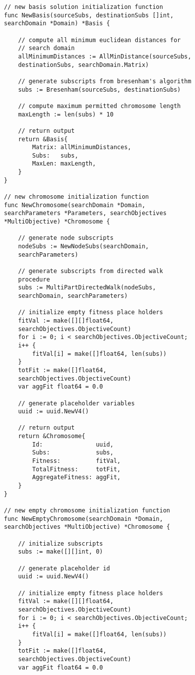 \begin{lstlisting}[basicstyle=\small]
// new basis solution initialization function
func NewBasis(sourceSubs, destinationSubs []int, 
searchDomain *Domain) *Basis {

	// compute all minimum euclidean distances for 
	// search domain
	allMinimumDistances := AllMinDistance(sourceSubs, 
	destinationSubs, searchDomain.Matrix)

	// generate subscripts from bresenham's algorithm
	subs := Bresenham(sourceSubs, destinationSubs)

	// compute maximum permitted chromosome length
	maxLength := len(subs) * 10

	// return output
	return &Basis{
		Matrix: allMinimumDistances,
		Subs:   subs,
		MaxLen: maxLength,
	}
}

// new chromosome initialization function
func NewChromosome(searchDomain *Domain, 
searchParameters *Parameters, searchObjectives 
*MultiObjective) *Chromosome {

	// generate node subscripts
	nodeSubs := NewNodeSubs(searchDomain, 
	searchParameters)

	// generate subscripts from directed walk 
	procedure
	subs := MultiPartDirectedWalk(nodeSubs, 
	searchDomain, searchParameters)

	// initialize empty fitness place holders
	fitVal := make([][]float64, 
	searchObjectives.ObjectiveCount)
	for i := 0; i < searchObjectives.ObjectiveCount; 
	i++ {
		fitVal[i] = make([]float64, len(subs))
	}
	totFit := make([]float64, 
	searchObjectives.ObjectiveCount)
	var aggFit float64 = 0.0

	// generate placeholder variables
	uuid := uuid.NewV4()

	// return output
	return &Chromosome{
		Id:               uuid,
		Subs:             subs,
		Fitness:          fitVal,
		TotalFitness:     totFit,
		AggregateFitness: aggFit,
	}
}

// new empty chromosome initialization function
func NewEmptyChromosome(searchDomain *Domain, 
searchObjectives *MultiObjective) *Chromosome {

	// initialize subscripts
	subs := make([][]int, 0)

	// generate placeholder id
	uuid := uuid.NewV4()

	// initialize empty fitness place holders
	fitVal := make([][]float64, 
	searchObjectives.ObjectiveCount)
	for i := 0; i < searchObjectives.ObjectiveCount; 
	i++ {
		fitVal[i] = make([]float64, len(subs))
	}
	totFit := make([]float64, 
	searchObjectives.ObjectiveCount)
	var aggFit float64 = 0.0


\end{lstlisting}
